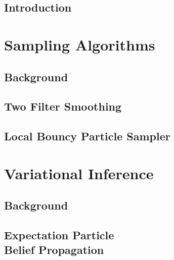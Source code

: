 


\doublespacing
\flushbottom

\chapter{Introduction}\setcounter{page}{1}

\ifintro\fi

\part{Sampling Algorithms} %

\chapter{Background}

\ifbgs\fi

\chapter{Two Filter Smoothing}

\iftfs\fi

\chapter{Local Bouncy Particle Sampler}

\iflbps\fi

\part{Variational Inference} %

\chapter{Background}

\ifbgm\fi

\chapter[EPBP]{Expectation Particle\\ Belief Propagation}

